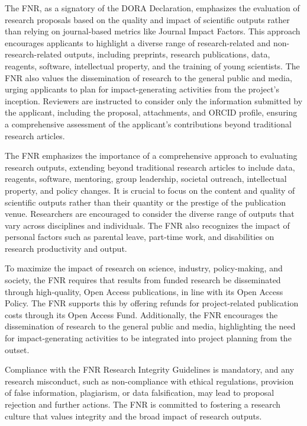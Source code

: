 \documentclass{article}
\begin{document}
The FNR, as a signatory of the DORA Declaration, emphasizes the evaluation of research proposals based on the quality and impact of scientific outputs rather than relying on journal-based metrics like Journal Impact Factors. This approach encourages applicants to highlight a diverse range of research-related and non-research-related outputs, including preprints, research publications, data, reagents, software, intellectual property, and the training of young scientists. The FNR also values the dissemination of research to the general public and media, urging applicants to plan for impact-generating activities from the project's inception. Reviewers are instructed to consider only the information submitted by the applicant, including the proposal, attachments, and ORCID profile, ensuring a comprehensive assessment of the applicant's contributions beyond traditional research articles.

The FNR emphasizes the importance of a comprehensive approach to evaluating research outputs, extending beyond traditional research articles to include data, reagents, software, mentoring, group leadership, societal outreach, intellectual property, and policy changes. It is crucial to focus on the content and quality of scientific outputs rather than their quantity or the prestige of the publication venue. Researchers are encouraged to consider the diverse range of outputs that vary across disciplines and individuals. The FNR also recognizes the impact of personal factors such as parental leave, part-time work, and disabilities on research productivity and output.

To maximize the impact of research on science, industry, policy-making, and society, the FNR requires that results from funded research be disseminated through high-quality, Open Access publications, in line with its Open Access Policy. The FNR supports this by offering refunds for project-related publication costs through its Open Access Fund. Additionally, the FNR encourages the dissemination of research to the general public and media, highlighting the need for impact-generating activities to be integrated into project planning from the outset.

Compliance with the FNR Research Integrity Guidelines is mandatory, and any research misconduct, such as non-compliance with ethical regulations, provision of false information, plagiarism, or data falsification, may lead to proposal rejection and further actions. The FNR is committed to fostering a research culture that values integrity and the broad impact of research outputs.
\end{document}
